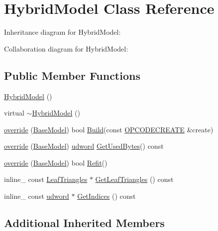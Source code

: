 \hypertarget{class_hybrid_model}{\section{Hybrid\+Model Class Reference}
\label{class_hybrid_model}
}


Inheritance diagram for Hybrid\+Model\+:


Collaboration diagram for Hybrid\+Model\+:
\subsection*{Public Member Functions}
\begin{DoxyCompactItemize}
\item 
\hyperlink{class_hybrid_model_a491e0cdf0550d09199ae2f0830588f36}{Hybrid\+Model} ()
\item 
virtual \hyperlink{class_hybrid_model_a68349a092c538c0a3e58ce455f273f6d}{$\sim$\+Hybrid\+Model} ()
\item 
\hyperlink{class_hybrid_model_aa59380d7035b6ba66ee39247de24609e}{override} (\hyperlink{class_base_model}{Base\+Model}) bool \hyperlink{class_base_model_ab2692ac2ec9c0c8c452d73f3a0bd341b}{Build}(const \hyperlink{struct_o_p_c_o_d_e_c_r_e_a_t_e}{O\+P\+C\+O\+D\+E\+C\+R\+E\+A\+T\+E} \&create)
\item 
\hyperlink{class_hybrid_model_aad99f00881d448709249cf5959dd1f3a}{override} (\hyperlink{class_base_model}{Base\+Model}) \hyperlink{_ice_types_8h_a44c6f1920ba5551225fb534f9d1a1733}{udword} \hyperlink{class_base_model_a714251e9cd861e4e304f5740c75a5b74}{Get\+Used\+Bytes}() const 
\item 
\hyperlink{class_hybrid_model_ab624c7cb773f7dd2c614fe9b8c00d02a}{override} (\hyperlink{class_base_model}{Base\+Model}) bool \hyperlink{class_base_model_a930a22828bbcab033ac73d2e2ead3ba4}{Refit}()
\item 
inline\+\_\+ const \hyperlink{struct_leaf_triangles}{Leaf\+Triangles} $\ast$ \hyperlink{class_hybrid_model_ae7c97d3ab7a1656125593cfdd641bebe}{Get\+Leaf\+Triangles} () const 
\item 
inline\+\_\+ const \hyperlink{_ice_types_8h_a44c6f1920ba5551225fb534f9d1a1733}{udword} $\ast$ \hyperlink{class_hybrid_model_a641aa5899ef8db31d9d18cbdf8ca50b7}{Get\+Indices} () const 
\end{DoxyCompactItemize}
\subsection*{Additional Inherited Members}



